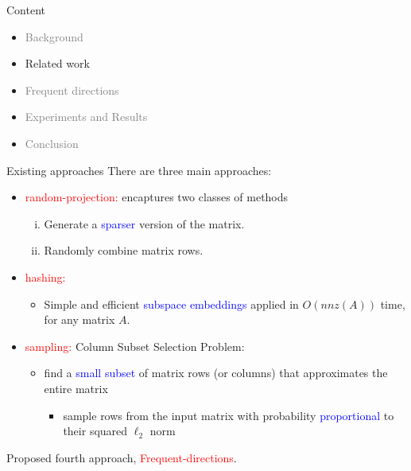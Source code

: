 \documentclass[first=dgreen,second=purple,logo=redque]{aaltoslides}
\begin{document}

\begin{frame}{Content}
\begin{itemize}
\item \textcolor{gray}{Background}
\item Related work
\item \textcolor{gray}{Frequent directions}
\item \textcolor{gray}{Experiments and Results}
\item \textcolor{gray}{Conclusion}
\end{itemize}
\end{frame}

\begin{frame}[allowframebreaks=1]{Existing approaches}
There are three main approaches:
\begin{itemize}
\item \textcolor{red}{random-projection:} encaptures two classes of methods
\begin{enumerate}[(i)]
  \item Generate a \textcolor{blue}{sparser} version of the matrix.
  \item \textcolor{dgreen}{Randomly combine} matrix rows.
\end{enumerate}
\item \textcolor{red}{hashing:} 
	\begin{itemize}
		\item Simple and efficient \textcolor{blue}{subspace embeddings} applied in $O(nnz(A))$ time, for any matrix $A$.
	\end{itemize}
\item \textcolor{red}{sampling:} \textcolor{dgreen}{Column Subset Selection Problem}:
\begin{itemize}
  \item find a \textcolor{blue}{small subset} of matrix rows (or columns) that approximates
  the entire matrix
   \begin{itemize}
   \item \textcolor{dgreen}{sample} rows from the input matrix with probability \textcolor{blue}{proportional} to
   their squared $\ell_{2}$ norm
   \end{itemize}
\end{itemize}
\end{itemize}

Proposed fourth approach, \textcolor{red}{Frequent-directions}.

\end{frame}
\end{document}
